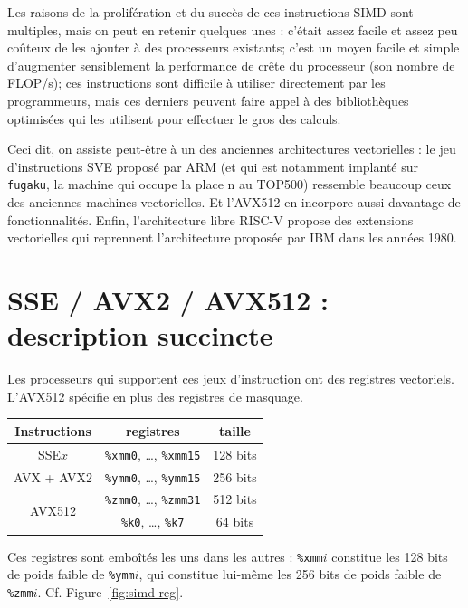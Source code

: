 Les raisons de la prolifération et du succès de ces instructions SIMD sont
multiples, mais on peut en retenir quelques unes : c'était assez facile et assez
peu coûteux de les ajouter à des processeurs existants; c'est un moyen facile et
simple d'augmenter sensiblement la performance de crête du processeur (son
nombre de FLOP/s); ces instructions sont difficile à utiliser directement par
les programmeurs, mais ces derniers peuvent faire appel à des bibliothèques
optimisées qui les utilisent pour effectuer le gros des calculs.

Ceci dit, on assiste peut-être à un  des anciennes
architectures vectorielles : le jeu d'instructions SVE proposé par ARM (et qui
est notamment implanté sur \texttt{fugaku}, la machine qui occupe la place
n au TOP500) ressemble beaucoup ceux des anciennes machines
vectorielles. Et l'AVX512 en incorpore aussi davantage de
fonctionnalités. Enfin, l'architecture libre RISC-V propose des extensions
vectorielles qui reprennent l'architecture proposée par IBM dans les années
1980.

\section{SSE / AVX2 / AVX512 : description succincte}

Les processeurs qui supportent ces jeux d'instruction ont des registres
\og vectoriels\fg. L'AVX512 spécifie en plus des registres de masquage.

\begin{center}
\begin{tabular}{|c|c|c|}
  \hline
  Instructions & registres & taille \\
  \hline\hline
  SSE$x$              & \texttt{\%xmm0}, \dots, \texttt{\%xmm15} & 128 bits \\
  \hline
  AVX + AVX2          & \texttt{\%ymm0}, \dots, \texttt{\%ymm15} & 256 bits \\
  \hline
  \multirow{2}{*}{AVX512} & \texttt{\%zmm0}, \dots, \texttt{\%zmm31} & 512 bits \\
               & \texttt{\%k0}, \dots, \texttt{\%k7}      & 64 bits \\
  \hline
\end{tabular}
\end{center}

Ces registres sont emboîtés les uns dans les autres : \texttt{\%xmm}$i$
constitue les 128 bits de poids faible de \texttt{\%ymm}$i$, qui constitue
lui-même les 256 bits de poids faible de
\texttt{\%zmm}$i$. Cf. Figure~\ref{fig:simd-reg}.


